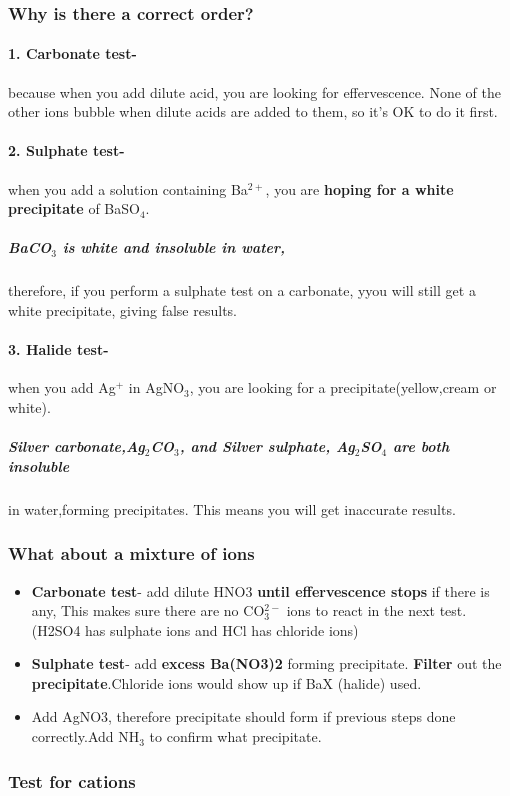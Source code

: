 \subsubsection{Why is there a correct order?}
\paragraph{1. Carbonate test-}because when you add dilute acid, you are looking for effervescence. None of the other ions bubble when dilute acids are added to them, so it's OK to do it first.
\paragraph{2. Sulphate test-} when you add a solution containing Ba$^{2+}$, you are \textbf{hoping for a white precipitate} of BaSO$_4$.
\subparagraph*{BaCO$_3$ is white and insoluble in water,}therefore, if you perform a sulphate test on a carbonate, yyou will still get a white precipitate, giving false results.
\paragraph{3. Halide test-} when you add Ag$^+$ in AgNO$_3$, you are looking for a precipitate(yellow,cream or white).
\subparagraph*{Silver carbonate,Ag$_2$CO$_3$, and Silver sulphate, Ag$_2$SO$_4$ are both insoluble} in water,forming precipitates. This means you will get inaccurate results.
\subsubsection{What about a mixture of ions}
\begin{itemize}
\item\textbf{ Carbonate test}- add dilute HNO3 \textbf{until effervescence stops} if there is any, This makes sure there are no CO$_3^{2-}$ ions to react in the next test.(H2SO4 has sulphate ions and HCl has chloride ions)
\item \textbf{Sulphate test}- add \textbf{excess Ba(NO3)2} forming precipitate. \textbf{Filter} out the \textbf{precipitate}.Chloride ions would show up if BaX (halide) used.
\item Add AgNO3, therefore precipitate should form if previous steps done correctly.Add NH$_3$ to confirm what precipitate.
\end{itemize}
\subsubsection*{Test for cations}
